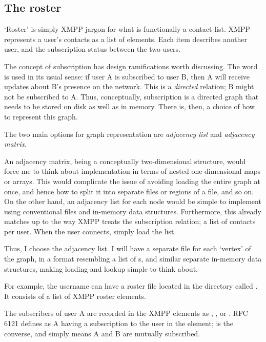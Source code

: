 \subsection{The roster}\label{sec:prep-roster}
`Roster' is simply XMPP jargon for what is functionally a contact list. XMPP represents a user's contacts as a list of  elements. Each item describes another user, and the subscription status between the two users.

The concept of subscription has design ramifications worth discussing. The word is used in its usual sense: if user A is subscribed to user B, then A will receive updates about B's presence on the network. This is a \emph{directed} relation; B might not be subscribed to A. Thus, conceptually, subscription is a directed graph that needs to be stored on disk as well as in memory. There is, then, a choice of how to represent this graph.

The two main options for graph representation are \emph{adjacency list} and \emph{adjacency matrix}.

An adjacency matrix, being a conceptually two-dimensional structure, would force me to think about implementation in terms of nested one-dimensional maps or arrays. This would complicate the issue of avoiding loading the entire graph at once, and hence how to split it into separate files or regions of a file, and so on. On the other hand, an adjacency list for each node would be simple to implement using conventional files and in-memory data structures. Furthermore, this already matches up to the way XMPP treats the subscription relation; a list of contacts per user. When the user connects, simply load the list.

Thus, I choose the adjacency list. I will have a separate file for each `vertex' of the graph, in a format resembling a list of s, and similar separate in-memory data structures, making loading and lookup simple to think about.

For example, the username  can have a roster file located in the  directory called . It consists of a list of XMPP roster  elements.

The subscribers of user A are recorded in the XMPP  elements as , , or . RFC 6121 defines  as A having a subscription to the user in the  element;  is the converse, and  simply means A and B are mutually subscribed.

